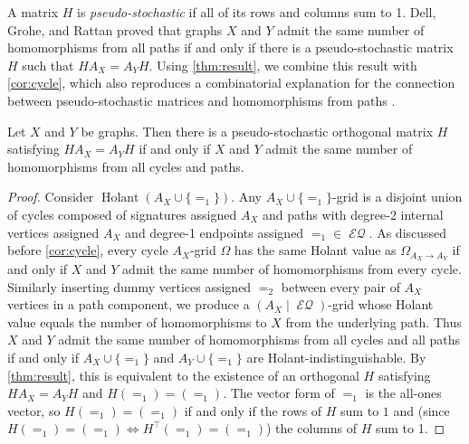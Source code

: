 \documentclass{article}
\DeclareMathOperator{\holant}{Holant}
\DeclareMathOperator{\eq}{\mathcal{EQ}}
\begin{document}
A matrix $H$ is \emph{pseudo-stochastic} if all of its rows and columns sum to 1. Dell, Grohe, and
Rattan \cite{dell} proved that graphs $X$ and $Y$ admit the same number of homomorphisms from all
paths if and only if there is a pseudo-stochastic matrix $H$ such that $HA_X = A_YH$. 
Using \autoref{thm:result}, we combine this result with \autoref{cor:cycle}, which also
reproduces a combinatorial explanation 
for the connection between pseudo-stochastic matrices and homomorphisms from paths 
\cite{grohe_homomorphism_2022}.
\begin{corollary}
    Let $X$ and $Y$ be graphs. Then there is a pseudo-stochastic orthogonal matrix $H$ satisfying 
    $H A_X = A_Y H$
    if and only if $X$ and $Y$ admit the same number of homomorphisms from all cycles and paths.
\end{corollary}
\begin{proof}
    Consider $\holant(A_X \cup \{=_1\})$. Any $A_X\cup \{=_1\}$-grid is a disjoint union of 
    cycles composed of signatures assigned $A_X$ and
    paths with degree-2 internal vertices assigned $A_X$ and degree-1 endpoints
    assigned $=_1 \in \eq$. As discussed before
    \autoref{cor:cycle}, every cycle $A_X$-grid $\Omega$ has the same Holant value as
    $\Omega_{A_X \to A_Y}$ if and only if $X$ and $Y$ admit the same
    number of homomorphisms from every cycle. Similarly inserting dummy vertices assigned $=_2$ between
    every pair of $A_X$ vertices in a path component, we produce
    a $(A_X \mid \eq)$-grid whose Holant value equals the number of homomorphisms to $X$ from the
    underlying path.
    Thus $X$ and $Y$ admit the same number of homomorphisms from all cycles and all paths
    if and only if $A_X \cup \{=_1\}$ and $A_Y \cup \{=_1\}$ are Holant-indistinguishable.
    By \autoref{thm:result}, this is equivalent to the existence of an orthogonal $H$ satisfying 
    $H A_X = A_Y H$ and $H (=_1) = (=_1)$.
    The vector form of $=_1$ is the all-ones vector, so $H (=_1) = (=_1)$ if and only if the rows
    of $H$ sum to $1$ and (since $H(=_1) = (=_1) \iff H^\top(=_1) = (=_1)$) the columns of $H$
    sum to 1.
\end{proof}
\end{document}
